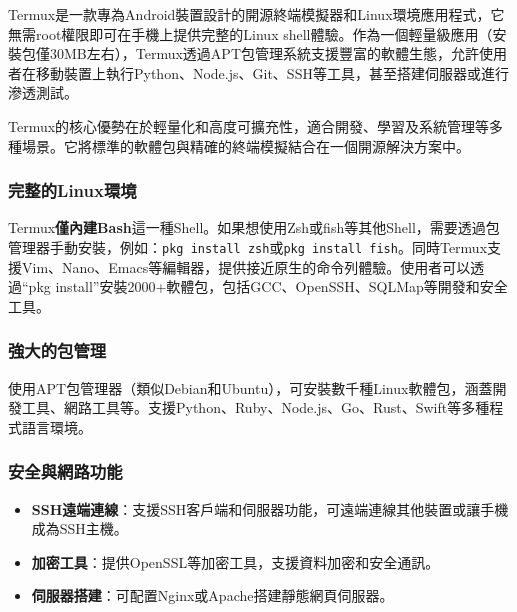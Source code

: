 


Termux是一款專為Android裝置設計的開源終端模擬器和Linux環境應用程式，它無需root權限即可在手機上提供完整的Linux shell體驗。作為一個輕量級應用（安裝包僅30MB左右），Termux透過APT包管理系統支援豐富的軟體生態，允許使用者在移動裝置上執行Python、Node.js、Git、SSH等工具，甚至搭建伺服器或進行滲透測試。

Termux的核心優勢在於輕量化和高度可擴充性，適合開發、學習及系統管理等多種場景。它將標準的軟體包與精確的終端模擬結合在一個開源解決方案中。


\subsubsection*{完整的Linux環境}

Termux\textbf{僅內建Bash}這一種Shell。如果想使用Zsh或fish等其他Shell，需要透過包管理器手動安裝，例如：\texttt{pkg install zsh}或\texttt{pkg install fish}。同時Termux支援Vim、Nano、Emacs等編輯器，提供接近原生的命令列體驗。使用者可以透過“pkg install”安裝2000+軟體包，包括GCC、OpenSSH、SQLMap等開發和安全工具。

\subsubsection*{強大的包管理}

使用APT包管理器（類似Debian和Ubuntu），可安裝數千種Linux軟體包，涵蓋開發工具、網路工具等。支援Python、Ruby、Node.js、Go、Rust、Swift等多種程式語言環境。

\subsubsection*{安全與網路功能}

\begin{itemize}
  \item \textbf{SSH遠端連線}：支援SSH客戶端和伺服器功能，可遠端連線其他裝置或讓手機成為SSH主機。
  \item \textbf{加密工具}：提供OpenSSL等加密工具，支援資料加密和安全通訊。
  \item \textbf{伺服器搭建}：可配置Nginx或Apache搭建靜態網頁伺服器。
\end{itemize}

